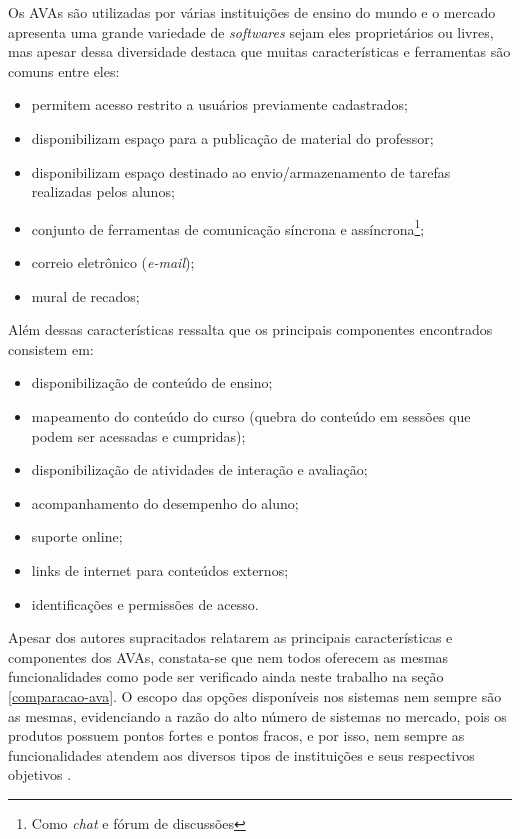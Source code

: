 Os AVAs são utilizadas por várias instituições de ensino do mundo e o mercado apresenta uma grande variedade de \textit{softwares} sejam eles proprietários ou livres, mas apesar dessa diversidade  destaca que muitas características e ferramentas são comuns entre eles:
\begin{itemize}
\item permitem acesso restrito a usuários previamente cadastrados;
\item disponibilizam espaço para a publicação de material do professor;
\item disponibilizam espaço destinado ao envio/armazenamento de tarefas realizadas pelos alunos;
\item conjunto de ferramentas de comunicação síncrona e assíncrona\footnote{Como \textit{chat} e fórum de discussões};
\item correio eletrônico (\textit{e-mail});
\item mural de recados;
\end{itemize}
Além dessas características  ressalta que os principais componentes encontrados consistem em:
\begin{itemize}
\item disponibilização de conteúdo de ensino;
\item mapeamento do conteúdo do curso (quebra do conteúdo em sessões que podem ser acessadas e cumpridas);
\item disponibilização de atividades de interação e avaliação;
\item acompanhamento do desempenho do aluno;
\item suporte online;
\item links de internet para conteúdos externos;
\item identificações e permissões de acesso.
\end{itemize}

Apesar dos autores supracitados relatarem as principais características e componentes dos AVAs, constata-se que nem todos oferecem as mesmas funcionalidades como pode ser verificado ainda neste trabalho na seção \ref{comparacao-ava}. O escopo das opções disponíveis nos sistemas nem sempre são as mesmas, evidenciando a razão do alto número de sistemas no mercado, pois os produtos possuem pontos fortes e pontos fracos, e por isso, nem sempre as funcionalidades atendem aos diversos tipos de instituições e seus respectivos objetivos \cite{aguado2013dimensoes}.

